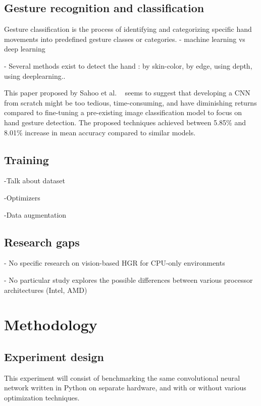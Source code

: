 \documentclass[12pt]{article}
\begin{document}
\subsection{Gesture recognition and classification}

Gesture classification is the process of identifying and categorizing specific hand movements into predefined gesture classes or categories. 
- machine learning vs deep learning

- Several methods exist to detect the hand : by skin-color, by edge, using depth, using deeplearning..

This paper proposed by Sahoo et al. ~\cite{sahoo2022real} seems to suggest that developing a CNN from scratch might be too tedious, time-consuming, and have diminishing returns compared to fine-tuning a pre-existing image classification model to focus on hand gesture detection. The proposed techniques achieved between 5.85\% and 8.01\% increase in mean accuracy compared to similar models.

\subsection{Training}

-Talk about dataset

-Optimizers

-Data augmentation

\subsection{Research gaps}

- No specific research on vision-based HGR for CPU-only environments

- No particular study explores the possible differences between various processor architectures (Intel, AMD)

\section{Methodology}

\subsection{Experiment design}

This experiment will consist of benchmarking the same convolutional neural network written in Python on separate hardware, and with or without various optimization techniques.
\end{document}
